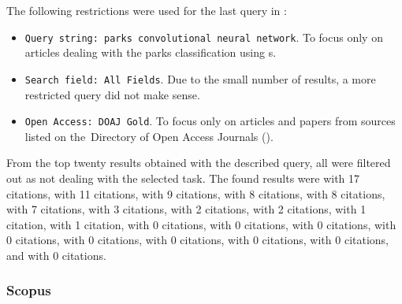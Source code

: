 The following restrictions were used for the last query in :

\begin{itemize}
	\item \verb|Query string: parks convolutional neural network|. To focus only on articles dealing with the parks classification using s.
	\item \verb|Search field: All Fields|. Due to the small number of results, a more restricted query did not make sense.
	\item \verb|Open Access: DOAJ Gold|. To focus only on articles and papers from sources listed on the~Di\-rectory of Open Access Journals ().
\end{itemize}

\noindent From the top twenty results obtained with the described query, all were filtered out as not dealing with the selected task. The found results were \cite{dl-rs-built-up-areas} with 17 citations, \cite{dl-bird-detection} with 11 citations, \cite{dnn-iot} with 9 citations, \cite{dl-sl-wetland} with 8 citations, \cite{dl-corneal-epithelium} with 8 citations, \cite{dl-age-estimation} with 7 citations, \cite{cnn-parking-occupacy} with 3 citations, \cite{ground-measurement-forest} with 2 citations, \cite{bike-sharing-destination} with 2 citations, \cite{w-net-lc} with 1 citation, \cite{mimo-fmcw-parking} with 1 citation, \cite{urban-green-obesity} with 0 citations, \cite{robust-parking-surveillance} with 0 citations, \cite{social-media-open-space} with 0 citations, \cite{dcnn-parking-detection} with 0 citations, \cite{review-crowd-monitoring} with 0 citations, \cite{dl-galapagos-snake} with 0 citations, \cite{deep-binary-vehicle} with 0 citations, \cite{cnn-parrots} with 0 citations, and \cite{indoor-positioning-error} with 0 citations.

\subsubsection{Scopus}
\label{urban-green-scopus}